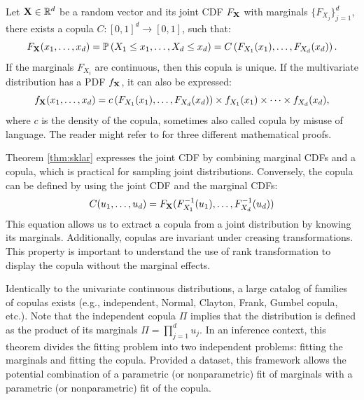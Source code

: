 \begin{theorem}
    Let $\mathbf{X} \in \mathbb{R}^d$ be a random vector and its joint CDF $F_{{\bf X}}$ with marginals $\{F_{X_j}\}_{j=1}^d$, there exists a copula $C: [0, 1]^d \rightarrow [0, 1]$, such that:
    \begin{equation}
        F_{{\bf X}}(x_1, \dots, x_d) = \mathbb{P}\left(X_1\leq x_1,\dots ,X_d\leq x_d\right) = C\left(F_{X_1}(x_1), \dots, F_{X_d}(x_d)\right). 
    \end{equation}
    If the marginals $F_{X_i}$ are continuous, then this copula is unique. 
    If the multivariate distribution has a PDF $f_{{\bf X}}$, it can also be expressed:
    \begin{equation}
        f_{{\bf X}}(x_1, \dots, x_d) = c\left(F_{X_1}(x_1), \dots, F_{X_d}(x_d)\right) \times f_{X_1}(x_1) \times \dots \times f_{X_d}(x_d),
    \end{equation}
    where $c$ is the density of the copula, sometimes also called copula by misuse of language. 
    The reader might refer to \cite{durante_2015_copula} for three different mathematical proofs. 
    \label{thm:sklar}
\end{theorem}

Theorem \ref{thm:sklar} expresses the joint CDF by combining marginal CDFs and a copula, which is practical for sampling joint distributions. 
Conversely, the copula can be defined by using the joint CDF and the marginal CDFs: 
\begin{equation}
    C(u_1, \dots, u_d) = F_{{\bf X}}(F^{-1}_{X_1}(u_1), \dots, F^{-1}_{X_d}(u_d))
\end{equation}
This equation allows us to extract a copula from a joint distribution by knowing its marginals.
Additionally, copulas are invariant under creasing transformations. 
This property is important to understand the use of rank transformation to display the copula without the marginal effects.     

Identically to the univariate continuous distributions, a large catalog of families of copulas exists (e.g., independent, Normal, Clayton, Frank, Gumbel copula, etc.). 
Note that the independent copula $\Pi$ implies that the distribution is defined as the product of its marginals $\Pi = \prod_{j=1}^d u_j$. 
In an inference context, this theorem divides the fitting problem into two independent problems: fitting the marginals and fitting the copula. 
Provided a dataset, this framework allows the potential combination of a parametric (or nonparametric) fit of marginals with a parametric (or nonparametric) fit of the copula. 

